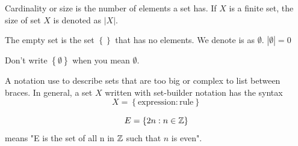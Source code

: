 \begin{definition}
     Cardinality or size is the number of elements a set has. If $X$ is a finite set, the size of set $X$ is denoted as $\left|X\right|$.
\end{definition}

\begin{definition}
     The empty set is the set $\left\{\right\}$ that has no elements. We denote is as $\emptyset$. $\left|\emptyset\right| = 0$
\end{definition}
\begin{remark}
    Don't write $\left\{\emptyset\right\}$ when you mean $\emptyset$.
\end{remark}

\begin{definition}
     A notation use to describe sets that are too big or complex to list between braces. 
    In general, a set $X$ written with set-builder notation has the syntax
    $$X = \left\{\text{expression} : \text{rule}\right\}$$
\end{definition}

\begin{example}
    \begin{equation*}
        E = \left\{2n : n \in \mathbb{Z}\right\}
    \end{equation*}
    means "E is the set of all n in $\mathbb{Z}$ such that $n$ is even".
\end{example}